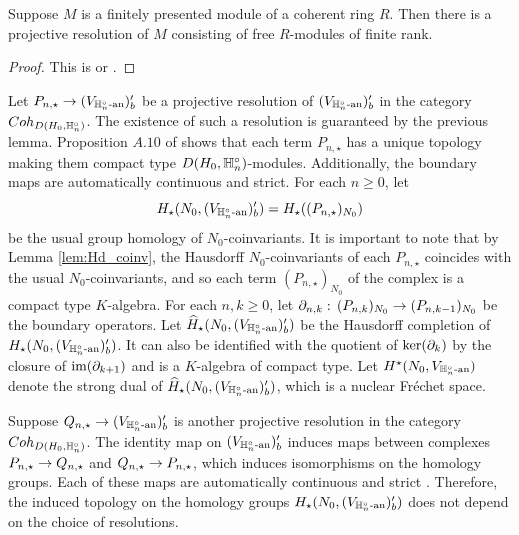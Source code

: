 \documentclass[10pt]{amsart}
\begin{document}
\begin{lemma}\label{lem:free_res}
Suppose $M$ is a finitely presented module of a coherent ring $R$. Then there is a projective resolution of $M$ consisting of free $R$-modules of finite rank. 
\end{lemma}
\begin{proof}
This is \cite[Cor. 2.5.2]{Glaz} or \cite[Rem. 1.4]{Gersten}.

\end{proof}

Let  $P_{n,\star}\rightarrow (V_{\mathbb{H}_{n}^{\circ}\textnormal{-an}})^{\prime}_{b}$ be a projective resolution of $(V_{\mathbb{H}_{n}^{\circ}\textnormal{-an}})^{\prime}_{b}$ in the category $Coh_{D(H_{0},\mathbb{H}_{n}^{\circ})}$. The existence of such a resolution is guaranteed by the previous lemma. Proposition $A.10$ of \cite{Jacquet2} shows that each term $P_{n,\star}$ has a unique topology making them compact type $D(H_{0},\mathbb{H}_{n}^{\circ})$-modules. Additionally, the boundary maps are automatically continuous and strict. For each $n\geq 0$, let \[
    H_{\star}(N_{0},(V_{\mathbb{H}_{n}^{\circ}\textnormal{-an}})^{\prime}_{b}) = H_{\star}((P_{n,\star})_{N_{0}})
\] be the usual group homology of $N_{0}$-coinvariants. It is important to note that by Lemma \ref{lem:Hd_coinv}, the Hausdorff $N_{0}$-coinvariants of each $P_{n,\star}$ coincides with the usual $N_{0}$-coinvariants, and so each term $(P_{n,\star})_{N_{0}}$ of the complex is a compact type $K$-algebra. For each $n,k\geq0$, let $\partial_{n,k}:\,(P_{n,k})_{N_{0}}\rightarrow (P_{n,k-1})_{N_{0}}$ be the boundary operators. Let $\widehat{H}_{\star}(N_{0},(V_{\mathbb{H}_{n}^{\circ}\textnormal{-an}})^{\prime}_{b})$ be the Hausdorff completion of $H_{\star}(N_{0},(V_{\mathbb{H}_{n}^{\circ}\textnormal{-an}})^{\prime}_{b})$. It can also be identified with the quotient of $\ker(\partial_{k})$ by the closure of $\textnormal{im}(\partial_{k+1})$ and is a $K$-algebra of compact type. Let $H^{\star}(N_{0},V_{\mathbb{H}_{n}^{\circ}\textnormal{-an}})$ denote the strong dual of $\widehat{H}_{\star}(N_{0},(V_{\mathbb{H}_{n}^{\circ}\textnormal{-an}})^{\prime}_{b})$, which is a nuclear Fr\'echet space.

Suppose $Q_{n,\star}\rightarrow (V_{\mathbb{H}_{n}^{\circ}\textnormal{-an}})^{\prime}_{b}$ is another projective resolution in the category $Coh_{D(H_{0},\mathbb{H}_{n}^{\circ})}$. The identity map on $(V_{\mathbb{H}_{n}^{\circ}\textnormal{-an}})^{\prime}_{b}$ induces maps between complexes $P_{n,\star} \rightarrow Q_{n,\star}$ and $Q_{n,\star}\rightarrow P_{n,\star}$, which induces isomorphisms on the homology groups. Each of these maps are automatically continuous and strict \cite[Prop. A.10]{Jacquet2}. Therefore, the induced topology on the homology groups $H_{\star}(N_{0},(V_{\mathbb{H}_{n}^{\circ}\textnormal{-an}})^{\prime}_{b})$ does not depend on the choice of resolutions. 
\end{document}

